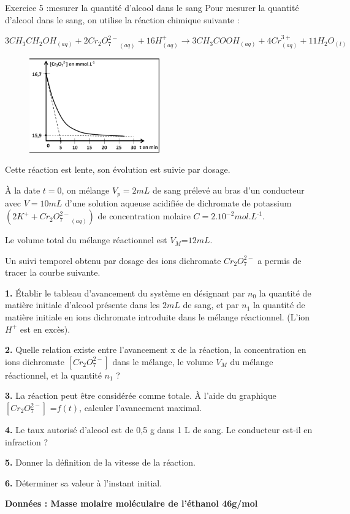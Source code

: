 \documentclass[12pt, french]{article}
\begin{document}
\vspace{-0.6cm}
\begin{Box2}{Exercice 5 :mesurer la quantité d’alcool dans le sang }
Pour mesurer la quantité d’alcool dans le sang, on utilise la réaction chimique suivante :

$3CH_3CH_2OH_{(aq)} + {2Cr_2O_7^{2-}}_{(aq)} + 16H^+_{(aq)} \rightarrow 3CH_3COOH_{(aq)} + 4Cr^{3+}_{(aq)} + 11H_2O_{(l)}$

	\begin{figure}
  \begin{center}
	  \vspace{-0.6cm}
	\includegraphics[width=0.5\textwidth]{./img/ex5.png}
  \end{center}
\end{figure}


Cette réaction est
lente, son évolution est suivie par dosage.

À la date $t = 0$, on mélange $V_p=2mL$ de sang prélevé au bras d’un conducteur avec $V= 10mL$ d’une solution aqueuse acidifiée de dichromate de potassium $(2K^+ + {Cr_2O_7^{2-}}_{(aq)})$ de concentration molaire $C=2.10^{-2} mol.L^{‐1}$.

Le volume total du mélange réactionnel est $V_M$=$12 mL$.

Un suivi temporel obtenu par dosage des ions dichromate $Cr_2O_7^{2-}$ a permis de tracer la courbe suivante.

\textbf{1. }Établir le tableau d’avancement du système en désignant par $n_0$ la quantité de matière initiale
d’alcool présente dans les $2mL$ de sang, et par $n_1$ la quantité de matière initiale en ions dichromate introduite dans le mélange réactionnel. (L’ion $H^+$ est en excès).

\textbf{2. }Quelle relation existe entre l’avancement x de la réaction, la concentration en ions dichromate $[Cr_2O_7^{2-}]$ dans le mélange, le volume $V_M$ du mélange réactionnel, et la quantité $n_1$ ?

\textbf{3. }La réaction peut être considérée comme
totale. À l’aide du graphique $[Cr_2O_7^{2-}]$ =$ f(t)$,
calculer l’avancement maximal.

\textbf{4. }Le taux autorisé d’alcool est de 0,5 g dans 1 L
de sang. Le conducteur est‐il en infraction ?

\textbf{5. }Donner la définition de la vitesse de la
réaction.

\textbf{6. }Déterminer sa valeur à l’instant initial.

\textbf{Données : Masse molaire moléculaire de l’éthanol 46g/mol}

\end{Box2}
\end{document}
